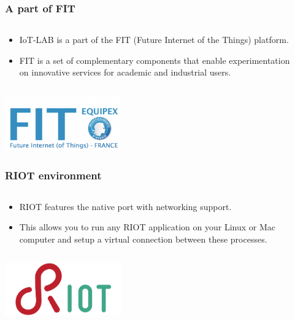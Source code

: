 \documentclass{beamer}
\begin{document}
\begin{frame}
	\frametitle{A part of FIT}
	\begin{columns}[c]
		\begin{column}{30cm}
			\vspace{.1cm}
			\begin{itemize}
				\justifying
				\item IoT-LAB is a part of the FIT (Future Internet of the Things) platform.
				\item FIT is a set of complementary components that enable experimentation\\
				on innovative services for academic and industrial users.
			\end{itemize}
		\end{column}
	\end{columns}
	\vspace{.5cm}
	\hspace*{5.5cm} \includegraphics[width=5cm]{figs/iot-lab-4.png}
\end{frame}

\begin{frame}
	\frametitle{RIOT environment}
	\begin{columns}[c]
		\begin{column}{30cm}
			\vspace{.1cm}
			\begin{itemize}
				\justifying
				\item RIOT features the native port with networking support.
				\item This allows you to run any RIOT application on your Linux or Mac\\
				computer and setup a virtual connection between these processes.
			\end{itemize}
		\end{column}
	\end{columns}
	\vspace{.5cm}
	\hspace*{5.5cm} \includegraphics[width=5cm]{figs/riot-logo.png}
\end{frame}
\end{document}
